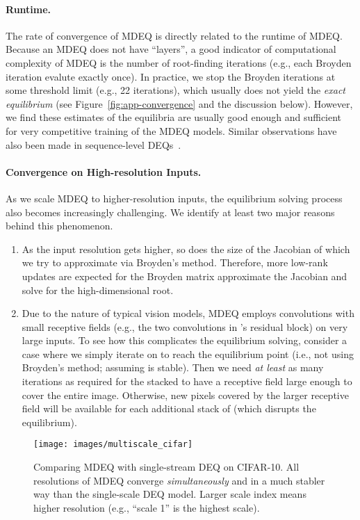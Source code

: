\documentclass{article}
\begin{document}
\paragraph{Runtime.} The rate of convergence of MDEQ is directly related to the runtime of MDEQ. Because an MDEQ does not have ``layers'', a good indicator of computational complexity of MDEQ is the number of root-finding iterations (e.g., each Broyden iteration evalute  exactly once). In practice, we stop the Broyden iterations at some threshold limit (e.g., 22 iterations), which usually does not yield the \emph{exact equilibrium} (see Figure~\ref{fig:app-convergence} and the discussion below). However, we find these estimates of the equilibria are usually good enough and sufficient for very competitive training of the MDEQ models. Similar observations have also been made in sequence-level DEQs~\cite{bai2019deep}.

\vspace{-.1in}
\paragraph{Convergence on High-resolution Inputs.} As we scale MDEQ to higher-resolution inputs, the equilibrium solving process also becomes increasingly challenging. We identify at least two major reasons behind this phenomenon.

\begin{enumerate}[leftmargin=*]
  \item As the input resolution gets higher, so does the size of the Jacobian of  which we try to approximate via Broyden's method. Therefore, more low-rank updates are expected for the Broyden matrix approximate the Jacobian and solve for the high-dimensional root.
  \item Due to the nature of typical vision models, MDEQ employs convolutions with small receptive fields (e.g., the two  convolutions in 's residual block) on very large inputs. To see how this complicates the equilibrium solving, consider a case where we simply iterate  on  to reach the equilibrium point (i.e., not using Broyden's method; assuming  is stable). Then we need \emph{at least} as many iterations as required for the stacked  to have a receptive field large enough to cover the entire image. Otherwise, new pixels covered by the larger receptive field will be available for each additional stack of  (which disrupts the equilibrium).
\end{enumerate}

\begin{wrapfigure}{r}{0.5\textwidth}
  \vspace{-.15in}
  \begin{center}
    \texttt{[image: images/multiscale\_cifar]}
  \end{center}
  \vspace{-.15in}
  \caption{Comparing MDEQ with single-stream DEQ on CIFAR-10. All resolutions of MDEQ converge \emph{simultaneously} and in a much stabler way than the single-scale DEQ model. Larger scale index means higher resolution (e.g., ``scale 1'' is the highest scale).}
  \label{fig:app-multiscale}
  \vspace{-.3in}
\end{wrapfigure}
\end{document}
